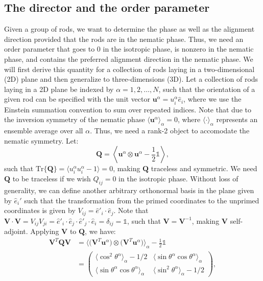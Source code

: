 \subsection{The director and the order parameter}
Given a group of rods, we want to determine the phase as well as the alignment direction provided that the rods are in the nematic phase.
Thus, we need an order parameter that goes to $0$ in the isotropic phase, is nonzero in the nematic phase, and contains the preferred alignment direction in the nematic phase.
We will first derive this quantity for a collection of rods laying in a two-dimensional (2D) plane and then generalize to three-dimensions (3D).
Let a collection of rods laying in a 2D plane be indexed by $\alpha = 1,2,\dots, N$, such that the orientation of a given rod can be specified with the unit vector $\mathbf{u}^{\alpha} = u^{\alpha}_i\hat{e}_i$, where we use the Einstein summation convention to sum over repeated indices.
Note that due to the inversion symmetry of the nematic phase $\langle \mathbf{u}^{\alpha}\rangle_{\alpha} = 0$, where $\langle \cdot \rangle_{\alpha}$ represents an ensemble average over all $\alpha$.
Thus, we need a rank-2 object to accomodate the nematic symmetry.
Let:
\begin{equation}
  \mathbf{Q} = \left \langle \mathbf{u}^{\alpha} \otimes \mathbf{u}^{\alpha} - \frac{1}{2} \mathbb{1} \right \rangle,\label{e:2-2DOrderRaw}
\end{equation}
such that $\textrm{Tr}\big \{ \mathbf{Q} \big \} = \langle u^{\alpha}_i u^{\alpha}_i - 1 \rangle = 0$, making $\mathbf{Q}$ traceless and symmetric.
We need $\mathbf{Q}$ to be traceless if we wish $Q_{ij} = 0$ in the isotropic phase.
Without loss of generality, we can define another arbitrary orthonormal basis in the plane given by $\hat{e}_i'$ such that the transformation from the primed coordinates to the unprimed coordinates is given by $V_{ij} = \hat{e}'_i \cdot \hat{e}_j$.
Note that $\mathbf{V} \cdot \mathbf{V} = V_{ij}V_{ji} = \hat{e}'_i \cdot \hat{e}_j \cdot \hat{e}'_j \cdot \hat{e}_i = \delta_{ij} = \mathbb{1}$, such that $\mathbf{V} = \mathbf{V}^{-1}$, making $\mathbf{V}$ self-adjoint.
Applying $\mathbf{V}$ to $\mathbf{Q}$, we have:
\begin{align}
  \mathbf{V}^T \mathbf{Q} \mathbf{V} &=
  \bigg \langle \big ( \mathbf{V}^T \mathbf{u}^{\alpha} \big ) \otimes \big ( \mathbf{V}^T \mathbf{u}^{\alpha} \big )\bigg \rangle_{\alpha}  - \frac{1}{2} \mathbb{1} \nonumber \\ & =
  \begin{pmatrix}
    \langle \cos^2 \theta^{\alpha}\rangle_{\alpha} - 1/2 & \langle \sin \theta^{\alpha} \cos \theta^{\alpha} \rangle_{\alpha} \\
    \langle \sin \theta^{\alpha} \cos \theta^{\alpha} \rangle_{\alpha} & \langle \sin^2 \theta^{\alpha} \rangle_{\alpha} - 1/2
  \end{pmatrix},\label{e:2-2DOrderRot}
\end{align}
